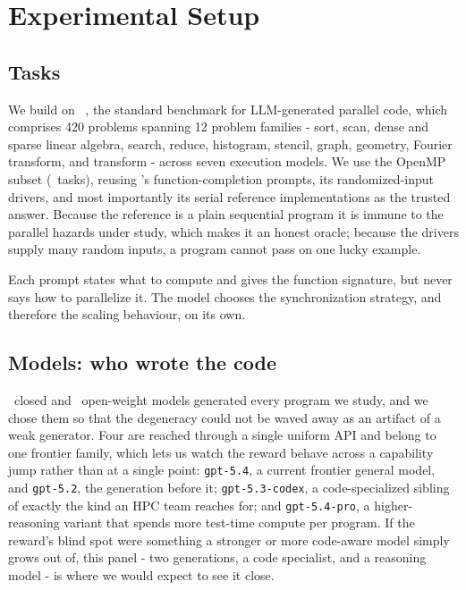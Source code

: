 \section{Experimental Setup}
\label{sec:setup}

\subsection{Tasks}

We build on \ParEval~\cite{pareval}, the standard benchmark for LLM-generated
parallel code, which comprises 420 problems spanning 12 problem
families - sort, scan, dense and sparse linear algebra, search, reduce,
histogram, stencil, graph, geometry, Fourier transform, and transform - across
seven execution models. We use the OpenMP subset (\NTasks\ tasks), reusing
\ParEval's function-completion prompts, its randomized-input drivers, and most
importantly its serial reference implementations as the trusted answer.
Because the reference is a plain sequential program it is immune to the
parallel hazards under study, which makes it an honest oracle; because the
drivers supply many random inputs, a program cannot pass on one lucky example.

Each prompt states what to compute and gives the function signature, but never
says how to parallelize it. The model chooses the synchronization strategy, and
therefore the scaling behaviour, on its own.

\subsection{Models: who wrote the code}

\NModels\ closed and \NOpenModels\ open-weight models generated every program we
study, and we chose them so that the degeneracy could not be waved away as an
artifact of a weak generator. Four are reached through a single uniform API and
belong to one frontier family, which lets us watch the reward behave across a
capability jump rather than at a single point: \texttt{gpt-5.4}, a current
frontier general model, and \texttt{gpt-5.2}, the generation before it;
\texttt{gpt-5.3-codex}, a code-specialized sibling of exactly the kind an HPC
team reaches for; and \texttt{gpt-5.4-pro}, a higher-reasoning variant that
spends more test-time compute per program. If the reward's blind spot were
something a stronger or more code-aware model simply grows out of, this
panel - two generations, a code specialist, and a reasoning model - is where we
would expect to see it close.

